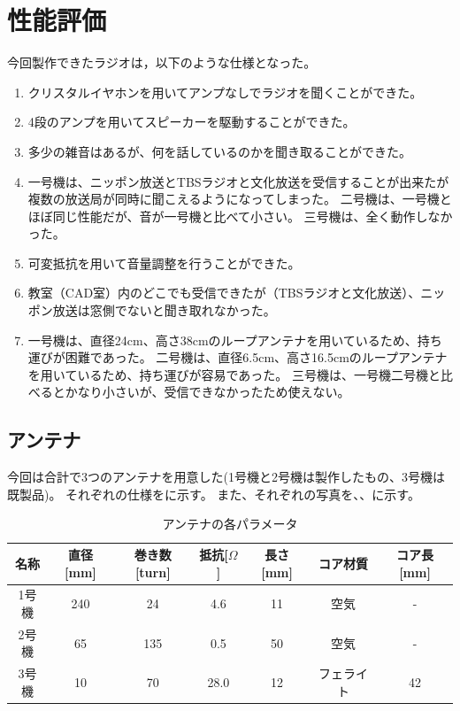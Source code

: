\documentclass[report.tex]{subfiles}
\begin{document}
\section{性能評価}

今回製作できたラジオは，以下のような仕様となった。

\begin{enumerate}
	\item クリスタルイヤホンを用いてアンプなしでラジオを聞くことができた。
	\item 4段のアンプを用いてスピーカーを駆動することができた。
	\item 多少の雑音はあるが、何を話しているのかを聞き取ることができた。
	\item 一号機は、ニッポン放送とTBSラジオと文化放送を受信することが出来たが複数の放送局が同時に聞こえるようになってしまった。
	      二号機は、一号機とほぼ同じ性能だが、音が一号機と比べて小さい。
	      三号機は、全く動作しなかった。
	\item 可変抵抗を用いて音量調整を行うことができた。
	\item 教室（CAD室）内のどこでも受信できたが（TBSラジオと文化放送）、ニッポン放送は窓側でないと聞き取れなかった。
	\item 一号機は、直径24cm、高さ38cmのループアンテナを用いているため、持ち運びが困難であった。
	      二号機は、直径6.5cm、高さ16.5cmのループアンテナを用いているため、持ち運びが容易であった。
	      三号機は、一号機二号機と比べるとかなり小さいが、受信できなかったため使えない。
\end{enumerate}

\subsection{アンテナ}

今回は合計で3つのアンテナを用意した(1号機と2号機は製作したもの、3号機は既製品)。
それぞれの仕様をに示す。
また、それぞれの写真を、、に示す。

\begin{table}[H]
	\centering
	\caption{アンテナの各パラメータ}
	\label{tab:ant}
	\begin{tabular}{ccccccc} \hline
		名称  & 直径[mm] & 巻き数[turn] & 抵抗[\(\Omega\)] & 長さ[mm] & コア材質  & コア長[mm] \\ \hline
		1号機 & 240    & 24        & 4.6            & 11     & 空気    & -       \\
		2号機 & 65     & 135       & 0.5            & 50     & 空気    & -       \\
		3号機 & 10     & 70        & 28.0           & 12     & フェライト & 42      \\ \hline
	\end{tabular}
\end{table}
\end{document}
